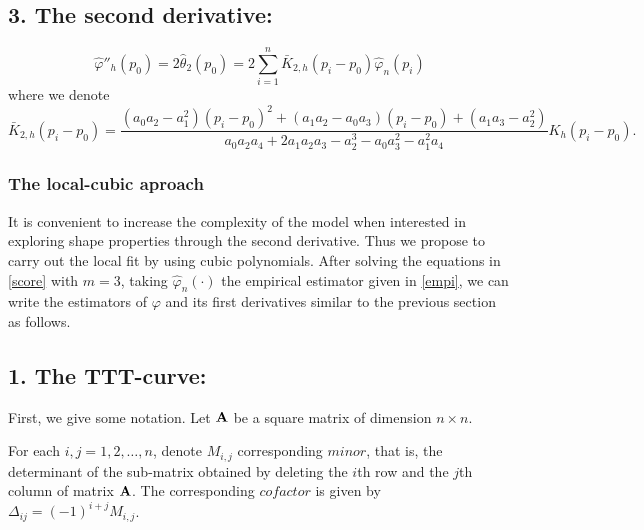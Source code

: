 \documentclass[preprint,12pt]{elsarticle}
\begin{document}
\subsection*{3. The second derivative: }
\begin{equation}\label{theta2}
\widehat{\varphi}''_h(p_0)=2 \widehat{\theta}_2(p_0) =2 \sum_{i=1}^n \bar{{K}}_{2,h}\left(p_i-p_0\right) \widehat{\varphi}_n(p_i)
\end{equation}
where we denote
\[
\bar{{K}}_{2,h}\left(p_i-p_0\right)=\frac{\left(a_0a_2-a_1^2\right)\left(p_i-p_0\right)^2+\left(a_1a_2-a_0a_3\right)\left(p_i-p_0\right)+\left(a_1a_3-a_2^2\right)}{a_0a_2a_4+2a_1a_2a_3-a_2^3-a_0a_3^2-a_1^2a_4} K_h\left(p_i-p_0\right).
\]
\bigskip

\subsubsection{The local-cubic aproach}

It is convenient to increase the complexity of the model when interested in exploring shape properties through the second derivative.
 Thus we propose to carry out the local fit by using cubic polynomials. After solving the equations in \eqref{score} with $m=3$, taking  $\widehat{\varphi}_n\left(\cdot\right)$ the empirical estimator given in \eqref{empi}, we can write the estimators of $\varphi$ and its first derivatives similar to the previous section as follows.

%

\subsection*{1. The TTT-curve: }%

\noindent First, we give some notation. Let ${\bf A}$ be a square matrix of dimension $n \times n$. 

For each $i, j =1,2,\ldots, n$, denote $M_{i,j}$ corresponding $minor$, that is, the determinant of the sub-matrix obtained by deleting the $i$th row and the $j$th column of matrix ${\bf A}$. The corresponding $cofactor$ is given by  $\Delta_{ij}=(-1)^{i+j} M_{i,j}$. 
\end{document}
